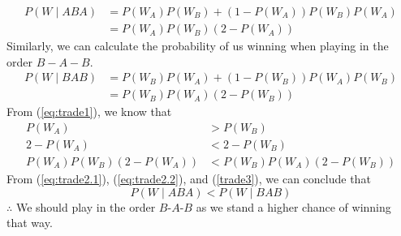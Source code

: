 \begin{align}\label{eq:trade2.1}
	P(W \mid ABA) & = P(W_A)P(W_B) + (1-P(W_A))P(W_B)P(W_A) \nonumber \\
	              & = P(W_A)P(W_B)(2 - P(W_A))
\end{align}
Similarly, we can calculate the probability of us winning when playing in the order $B-A-B$.
\begin{align}\label{eq:trade2.2}
	P(W \mid BAB) & = P(W_B)P(W_A) + (1-P(W_B))P(W_A)P(W_B) \nonumber \\
	              & = P(W_B)P(W_A)(2 - P(W_B))
\end{align}
From (\ref{eq:trade1}), we know that
\begin{align}\label{trade3}
	P(W_A)                   & > P(W_B)     \nonumber     \\
	2 - P(W_A)               & < 2 - P(W_B)\nonumber      \\
	P(W_A)P(W_B)(2 - P(W_A)) & < P(W_B)P(W_A)(2 - P(W_B))
\end{align}
From (\ref{eq:trade2.1}), (\ref{eq:trade2.2}), and (\ref{trade3}), we can conclude that
\[P(W \mid ABA) < P(W \mid BAB)\]
$\therefore$ We should play in the order $B$-$A$-$B$ as we stand a higher chance of winning that way.
